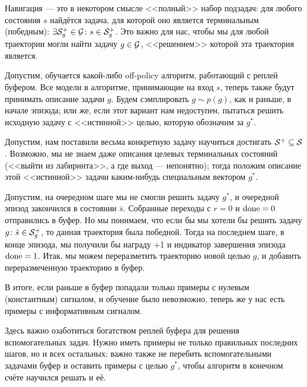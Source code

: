 Навигация --- это в некотором смысле <<полный>> набор подзадач: для любого состояния $s$ найдётся задача, для которой оно является терминальным (победным): $\exists \mathcal{S}^+_g \in \mathcal{G} \colon s \in \mathcal{S}^+_g$. Это важно для нас, чтобы мы для любой траектории могли найти задачу $g \HM\in \G$, <<решением>> которой эта траектория является.

Допустим, обучается какой-либо off-policy алгоритм, работающий с реплей буфером. Все модели в алгоритме, принимающие на вход $s$, теперь также будут принимать описание задачи $g$. Будем сэмплировать $g \sim p(g)$, как и раньше, в начале эпизода; или же, если этот вариант нам недоступен, пытаться решить исходную задачу с <<истинной>> целью, которую обозначим за $g^*$. 

\begin{remark}
Допустим, нам поставили весьма конкретную задачу научиться достигать $\mathcal{S}^+ \subseteq \mathcal{S}$. Возможно, мы не знаем даже описания целевых терминальных состояний (<<выйти из лабиринта>>, а где выход --- непонятно); тогда положим описание этой <<истинной>> задачи каким-нибудь специальным вектором $g^*$.
\end{remark}

\begin{wrapfigure}{r}{0.35\textwidth}
\vspace{-0.4cm}
\centering
{}
\vspace{-0.5cm}
\end{wrapfigure}

Допустим, на очередном шаге мы не смогли решить задачу $g^*$, и очередной эпизод закончился в состоянии $\bar{s}$. Собранные переходы с $r = 0$ и $\mathrm{done} = 0$ отправились в буфер. Но мы понимаем, что если бы мы хотели бы решить задачу $g \colon \bar{s} \in \mathcal{S}^+_g$, то данная траектория была победной. Тогда на последнем шаге, в конце эпизода, мы получили бы награду +1 и индикатор завершения эпизода $\mathrm{done} = 1$. Итак, мы можем переразметить траекторию новой целью $g$, и добавить переразмеченную траекторию в буфер.

В итоге, если раньше в буфер попадали только примеры с нулевым (константным) сигналом, и обучение было невозможно, теперь же у нас есть примеры с информативным сигналом.  

Здесь важно озаботиться богатством реплей буфера для решения вспомогательных задач. Нужно иметь примеры не только правильных последних шагов, но и всех остальных; важно также не перебить вспомогательными задачами буфер и оставить примеры с целью $g^*$, чтобы алгоритм в конечном счёте научился решать и её.

